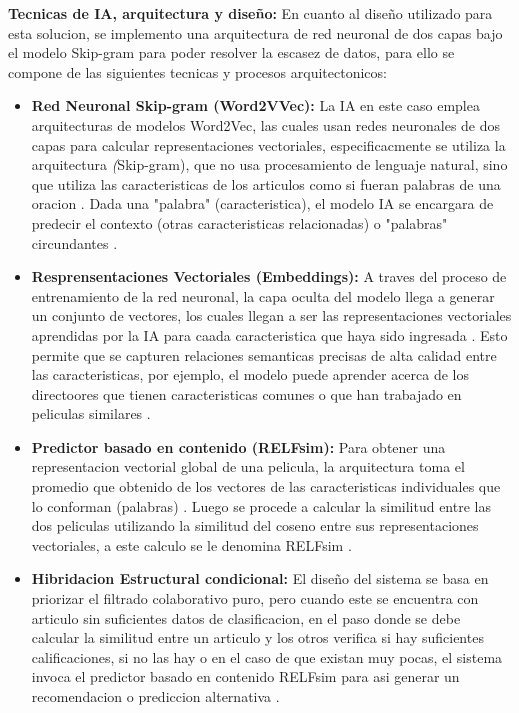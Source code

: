\documentclass[12pt]{article}
\begin{document}
\begin{itemize}
\textbf{Tecnicas de IA, arquitectura y diseño: }
En cuanto al diseño utilizado para esta solucion, se implemento una arquitectura de red neuronal de dos capas bajo el modelo Skip-gram para poder resolver la escasez de datos, para ello se compone de las siguientes tecnicas y procesos arquitectonicos:
\begin{itemize}
	\item \textbf{Red Neuronal Skip-gram (Word2VVec):} La IA en este caso emplea arquitecturas de modelos Word2Vec, las cuales usan redes neuronales de dos capas para calcular representaciones vectoriales, especificacmente se utiliza la arquitectura \textit(Skip-gram), que no usa procesamiento de lenguaje natural, sino que utiliza las caracteristicas de los articulos como si fueran palabras de una oracion \cite{DBLP:journals/corr/abs-2005-08148}. Dada una "palabra" (caracteristica), el modelo IA se encargara de predecir el contexto (otras caracteristicas relacionadas) o "palabras" circundantes \cite{DBLP:journals/corr/abs-2005-08148}.
	\item \textbf{Resprensentaciones Vectoriales (Embeddings):} A traves del proceso de entrenamiento de la red neuronal, la capa oculta del modelo llega a generar un conjunto de vectores, los cuales llegan a ser las representaciones vectoriales aprendidas por la IA para caada caracteristica que haya sido ingresada \cite{DBLP:journals/corr/abs-2005-08148}. Esto permite que se capturen relaciones semanticas precisas de alta calidad entre las caracteristicas, por ejemplo, el modelo puede aprender acerca de los directoores que tienen caracteristicas comunes o que han trabajado en peliculas similares \cite{DBLP:journals/corr/abs-2005-08148}.
	\item \textbf{Predictor basado en contenido (RELFsim): } Para obtener una representacion vectorial global de una pelicula, la arquitectura toma el promedio que obtenido de los vectores de las caracteristicas individuales que lo conforman (palabras) \cite{DBLP:journals/corr/abs-2005-08148}. Luego se procede a calcular la similitud entre las dos peliculas utilizando la similitud del coseno entre sus representaciones vectoriales, a este calculo se le denomina RELFsim \cite{DBLP:journals/corr/abs-2005-08148}.
	\item \textbf{Hibridacion Estructural condicional: } El diseño del sistema se basa en priorizar el filtrado colaborativo puro, pero cuando este se encuentra con articulo sin  suficientes datos de clasificacion, en el paso donde se debe calcular la similitud entre un articulo y los otros verifica si hay suficientes calificaciones, si no las hay o en el caso de que existan muy pocas, el sistema invoca el predictor basado en contenido RELFsim para asi generar un recomendacion o prediccion alternativa \cite{DBLP:journals/corr/abs-2005-08148}.
\end{itemize}

\end{itemize}
\end{document}
